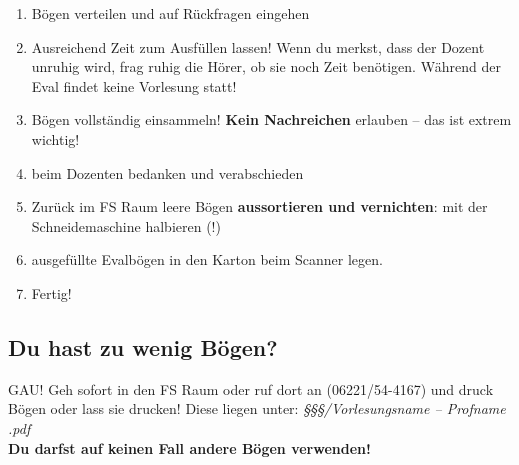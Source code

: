 \documentclass[a4paper,10pt]{article}
\begin{document}
\begin{enumerate}
\begin{itemize}
    \end{itemize}
\item Bögen verteilen und auf Rückfragen eingehen
\item Ausreichend Zeit zum Ausfüllen lassen! Wenn du merkst, dass der
  Dozent unruhig wird, frag ruhig die Hörer, ob sie noch Zeit
  benötigen. Während der Eval findet keine Vorlesung statt!
\item Bögen vollständig einsammeln! \textbf{Kein Nachreichen} erlauben -- das
  ist extrem wichtig!
\item beim Dozenten bedanken und verabschieden
\item Zurück im FS Raum leere Bögen \textbf{aussortieren und vernichten}: mit
  der Schneidemaschine halbieren (!)
\item ausgefüllte Evalbögen in den Karton beim Scanner legen.
\item Fertig!
\end{enumerate}

\subsection*{Du hast zu wenig Bögen?}
GAU! Geh sofort in den FS Raum oder ruf dort an (06221/54-4167) und
druck Bögen oder lass sie drucken! Diese liegen unter:
\textit{§§§/\glqq Vorlesungsname -- Profname\grqq
  .pdf}\\ \textbf{Du darfst auf keinen Fall andere Bögen verwenden!}
\end{document}
